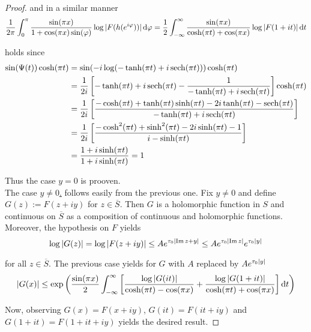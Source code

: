 \begin{proof}
\noindent and in a similar manner	
\begin{equation*}
	\frac{1}{2\pi} \int_0^\pi \frac{\sin(\pi x)}{1 + \cos(\pi x)\sin(\varphi)} \log \abs[0]{ F(h(e^{i\varphi}))} \d\varphi = \frac{1}{2}\int_{-\infty}^\infty\frac{\sin(\pi x)}{\cosh(\pi t) + \cos(\pi x)} \log\abs[0]{ F(1 + it) } \d t
\end{equation*}

\noindent holds since
\begin{align*}
		\sin(\Psi(t))\cosh(\pi t) &= \sin( -i\log( -\tanh (\pi t) + i \sech(\pi t) )) \cosh(\pi t)\\
		&= \frac{1}{2i} \sbr[3]{ -\tanh(\pi t) + i\sech(\pi t) - \frac{1}{-\tanh(\pi t) + i\sech(\pi t) }}\cosh(\pi t)\\
		&= \frac{1}{2i} \sbr[3]{ \frac{-\cosh(\pi t) + \tanh(\pi t) \sinh(\pi t) - 2i\tanh(\pi t) - \sech(\pi t)}{-\tanh(\pi t) + i\sech(\pi t)}}\\
		&= \frac{1}{2i} \sbr[3]{ \frac{- \cosh^2(\pi t) + \sinh^2(\pi t) - 2i \sinh(\pi t) - 1}{i - \sinh(\pi t)}}\\
		&= \frac{1 + i\sinh(\pi t)}{1 + i\sinh(\pi t)} = 1
\end{align*}

Thus the case $y = 0$ is prooven.\\
The case \underline{$y \neq 0$.} follows easily from the previous one. Fix $y \neq 0$ and define $G(z) := F(z + iy)$ for $z \in \overline{S}$. Then $G$ is a holomorphic function in $S$ and continuous on $\overline{S}$ as a composition of continuous and holomorphic functions. Moreover, the hypothesis on $F$ yields
	\begin{equation}
		\log \abs[0]{ G(z) } = \log \abs[0]{ F(z + iy) } \leq Ae^{\tau_0 \abs[0]{ \Im z + y}} \leq Ae^{\tau_0 \abs[0]{ \Im z }}e^{\tau_0 \abs[0]{ y }}
	\end{equation}

	for all $z \in \overline{S}$. The previous case yields for $G$ with $A$ replaced by $Ae^{\tau_0\abs[0]{ y }}$
	\begin{equation}
		\abs[0]{ G(x) } \leq \exp\del[3]{ \frac{\sin(\pi x)}{2} \int_{-\infty}^\infty \sbr{ \frac{\log \abs[0]{ G(it)}}{\cosh(\pi t) - \cos(\pi x)} + \frac{\log \abs[0]{ G(1 + it)}}{\cosh(\pi t) + \cos(\pi x)} } \d t}
	\end{equation}

	Now, observing $G(x) = F(x + iy)$, $G(it) = F(it + iy)$ and $G(1 + it) = F(1 + it + iy)$ yields the desired result.
\end{proof}

